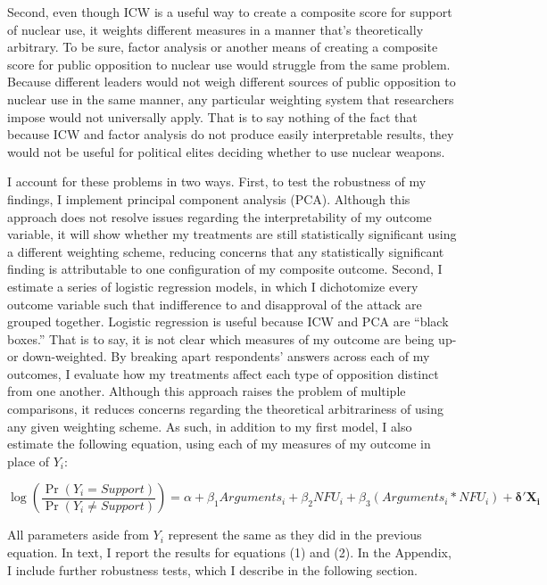\documentclass[12pt]{article}
\begin{document}
Second, even though ICW is a useful way to create a composite score for support of nuclear use, it weights different measures in a manner that's theoretically arbitrary. To be sure, factor analysis or another means of creating a composite score for public opposition to nuclear use would struggle from the same problem. Because different leaders would not weigh different sources of public opposition to nuclear use in the same manner, any particular weighting system that researchers impose would not universally apply. That is to say nothing of the fact that because ICW and factor analysis do not produce easily interpretable results, they would not be useful for political elites deciding whether to use nuclear weapons. 

I account for these problems in two ways. First, to test the robustness of my findings, I implement principal component analysis (PCA). Although this approach does not resolve issues regarding the interpretability of my outcome variable, it will show whether my treatments are still statistically significant using a different weighting scheme, reducing concerns that any statistically significant finding is attributable to one configuration of my composite outcome. Second, I estimate a series of logistic regression models, in which I dichotomize every outcome variable such that indifference to and disapproval of the attack are grouped together. Logistic regression is useful because ICW and PCA are “black boxes.” That is to say, it is not clear which measures of my outcome are being up- or down-weighted. By breaking apart respondents' answers across each of my outcomes, I evaluate how my treatments affect each type of opposition distinct from one another. Although this approach raises the problem of multiple comparisons, it reduces concerns regarding the theoretical arbitrariness of using any given weighting scheme. As such, in addition to my first model, I also estimate the following equation, using each of my measures of my outcome in place of $Y_i$:

\begin{equation}
\log(\frac{\Pr(Y_i=Support)}{\Pr(Y_i\neq Support)})=\alpha+\beta_{1}Arguments_i+\beta_{2}NFU_{i}+\beta_{3}(Arguments_i*NFU_i)+\mathbf{\delta'X_i}
\end{equation}

\noindent
All parameters aside from $Y_i$ represent the same as they did in the previous equation. In text, I report the results for equations (1) and (2). In the Appendix, I include further robustness tests, which I describe in the following section. 
\end{document}

